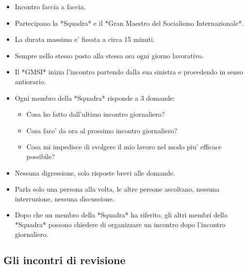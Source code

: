 \begin{itemize}
  \item Incontro faccia a faccia.
  \item Partecipano la *Squadra* e il *Gran Maestro del Socialismo Internazionale*.
  \item La durata massima e' fissata a circa 15 minuti.
  \item Sempre nello stesso posto alla stessa ora ogni giorno lavorativo.
  \item Il *GMSI* inizia l'incontro partendo dalla sua sinistra e procedendo in senso antiorario.
  \item Ogni membro della *Squadra* risponde a 3 domande:
  \begin{itemize}
    \item Cosa ho fatto dall'ultimo incontro giornaliero?
    \item Cosa faro' da ora al prossimo incontro giornaliero?
    \item Cosa mi impedisce di svolgere il mio lavoro nel modo piu' efficace possibile?
  \end{itemize}
  \item Nessuna digressione, solo risposte brevi alle domande.
  \item Parla solo una persona alla volta, le altre persone ascoltano, nessuna interruzione, nessuna discussione.
  \item Dopo che un membro della *Squadra* ha riferito, gli altri membri della *Squadra* possono chiedere di organizzare un incontro dopo l'incontro giornaliero.
\end{itemize}

\subsection{Gli incontri di revisione}

